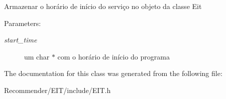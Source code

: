 Armazenar o horário de início do serviço no objeto da classe Eit \begin{Desc}
\item[Parameters:]
\begin{description}
\item[{\em start\_\-time}]um char $\ast$ com o horário de início do programa \end{description}
\end{Desc}


The documentation for this class was generated from the following file:\begin{CompactItemize}
\item 
Recommender/EIT/include/EIT.h\end{CompactItemize}
